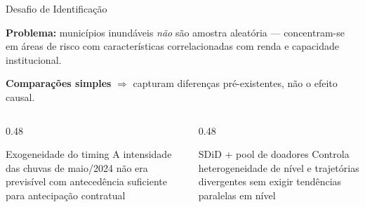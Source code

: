 \documentclass[11pt, aspectratio=169]{beamer}
\begin{document}
\begin{frame}{Desafio de Identificação}

\textbf{Problema:} municípios inundáveis \emph{não} são amostra aleatória --- concentram-se em áreas de risco com características correlacionadas com renda e capacidade institucional.

\smallskip
\textbf{Comparações simples} $\Rightarrow$ capturam diferenças pré-existentes, não o efeito causal.

\smallskip
\begin{columns}[T]
\begin{column}{0.48\textwidth}
  \begin{block}{Exogeneidade do timing}
    A intensidade das chuvas de maio/2024 não era previsível com antecedência suficiente para antecipação contratual \cite{elsner2024}
  \end{block}
\end{column}
\begin{column}{0.48\textwidth}
  \begin{block}{SDiD + pool de doadores}
    Controla heterogeneidade de nível e trajetórias divergentes sem exigir tendências paralelas em nível \cite{arkhangelsky2021}
  \end{block}
\end{column}
\end{columns}

\end{frame}
\end{document}
